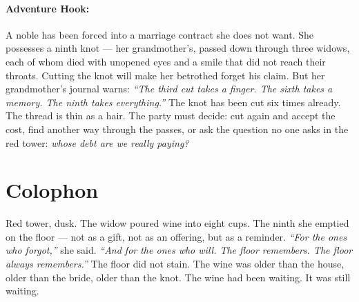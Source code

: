 \paragraph{Adventure Hook:}
A noble has been forced into a marriage contract she does not want. She possesses a ninth knot — her grandmother's, passed down through three widows, each of whom died with unopened eyes and a smile that did not reach their throats. Cutting the knot will make her betrothed forget his claim. But her grandmother's journal warns: \textit{``The third cut takes a finger. The sixth takes a memory. The ninth takes everything.''} The knot has been cut six times already. The thread is thin as a hair. The party must decide: cut again and accept the cost, find another way through the passes, or ask the question no one asks in the red tower: \textit{whose debt are we really paying?}

\section*{Colophon}
Red tower, dusk. The widow poured wine into eight cups. The ninth she emptied on the floor — not as a gift, not as an offering, but as a reminder. \textit{``For the ones who forgot,''} she said. \textit{``And for the ones who will. The floor remembers. The floor always remembers.''} The floor did not stain. The wine was older than the house, older than the bride, older than the knot. The wine had been waiting. It was still waiting.